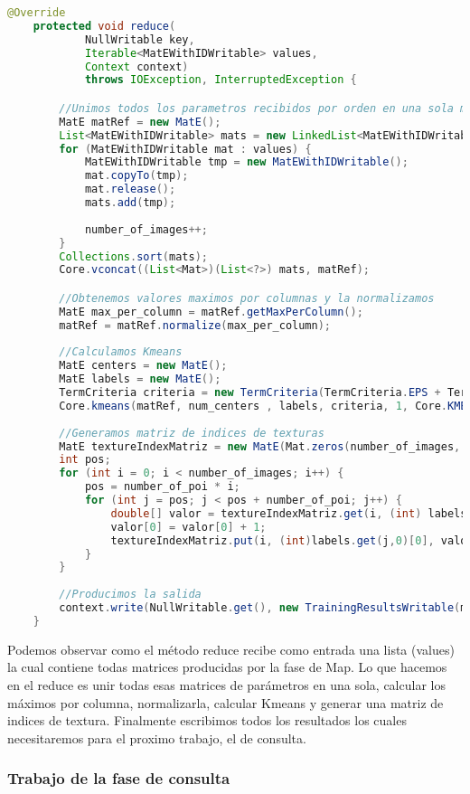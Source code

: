  \begin{lstlisting}[language=Java]
@Override
	protected void reduce(
			NullWritable key,
			Iterable<MatEWithIDWritable> values,
			Context context)
			throws IOException, InterruptedException {

		//Unimos todos los parametros recibidos por orden en una sola matriz
		MatE matRef = new MatE();
		List<MatEWithIDWritable> mats = new LinkedList<MatEWithIDWritable>();
		for (MatEWithIDWritable mat : values) {
			MatEWithIDWritable tmp = new MatEWithIDWritable();
			mat.copyTo(tmp);
			mat.release();
			mats.add(tmp);
			
			number_of_images++;
		}
		Collections.sort(mats);
		Core.vconcat((List<Mat>)(List<?>) mats, matRef);

		//Obtenemos valores maximos por columnas y la normalizamos
		MatE max_per_column = matRef.getMaxPerColumn();
		matRef = matRef.normalize(max_per_column);
		
		//Calculamos Kmeans
		MatE centers = new MatE();
		MatE labels = new MatE();
		TermCriteria criteria = new TermCriteria(TermCriteria.EPS + TermCriteria.MAX_ITER, 10000, 0.0001);
		Core.kmeans(matRef, num_centers , labels, criteria, 1, Core.KMEANS_RANDOM_CENTERS, centers);
		
		//Generamos matriz de indices de texturas
		MatE textureIndexMatriz = new MatE(Mat.zeros(number_of_images, num_centers, CvType.CV_32F));
		int pos;
		for (int i = 0; i < number_of_images; i++) {
			pos = number_of_poi * i;
			for (int j = pos; j < pos + number_of_poi; j++) {
				double[] valor = textureIndexMatriz.get(i, (int) labels.get(j, 0)[0]);
				valor[0] = valor[0] + 1;
				textureIndexMatriz.put(i, (int)labels.get(j,0)[0], valor);
			}
		}
		
		//Producimos la salida
		context.write(NullWritable.get(), new TrainingResultsWritable(max_per_column, centers, textureIndexMatriz));
	}
\end{lstlisting}

Podemos observar como el método reduce recibe como entrada una lista (values) la cual contiene todas matrices producidas por la fase de Map. Lo que hacemos en el reduce es unir todas esas matrices de parámetros en una sola, calcular los máximos por columna, normalizarla, calcular Kmeans y generar una matriz de indices de textura. Finalmente escribimos todos los resultados los cuales necesitaremos para el proximo trabajo, el de consulta.

\subsubsection{Trabajo de la fase de consulta}

